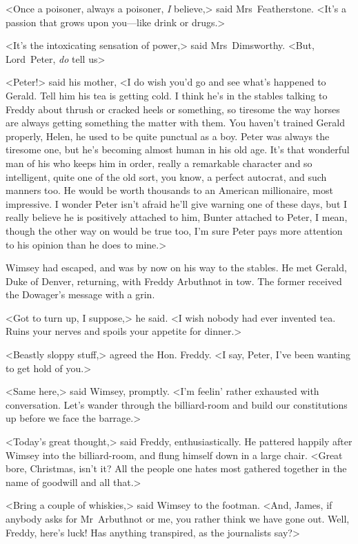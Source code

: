 <Once a poisoner, always a poisoner, \emph{I} believe,> said Mrs~Featherstone. <It's a passion that grows upon you—like drink or drugs.>

<It's the intoxicating sensation of power,> said Mrs~Dimsworthy. <But, Lord~Peter, \emph{do} tell us\longdash>

<Peter!> said his mother, <I do wish you'd go and see what's happened to Gerald. Tell him his tea is getting cold. I think he's in the stables talking to Freddy about thrush or cracked heels or something, so tiresome the way horses are always getting something the matter with them. You haven't trained Gerald properly, Helen, he used to be quite punctual as a boy. Peter was always the tiresome one, but he's becoming almost human in his old age. It's that wonderful man of his who keeps him in order, really a remarkable character and so intelligent, quite one of the old sort, you know, a perfect autocrat, and such manners too. He would be worth thousands to an American millionaire, most impressive. I wonder Peter isn't afraid he'll give warning one of these days, but I really believe he is positively attached to him, Bunter attached to Peter, I mean, though the other way on would be true too, I'm sure Peter pays more attention to his opinion than he does to mine.>

Wimsey had escaped, and was by now on his way to the stables. He met Gerald, Duke of Denver, returning, with Freddy Arbuthnot in tow. The former received the Dowager's message with a grin.

<Got to turn up, I suppose,> he said. <I wish nobody had ever invented tea. Ruins your nerves and spoils your appetite for dinner.>

<Beastly sloppy stuff,> agreed the Hon. Freddy. <I say, Peter, I've been wanting to get hold of you.>

<Same here,> said Wimsey, promptly. <I'm feelin' rather exhausted with conversation. Let's wander through the billiard-room and build our constitutions up before we face the barrage.>

<Today's great thought,> said Freddy, enthusiastically. He pattered happily after Wimsey into the billiard-room, and flung himself down in a large chair. <Great bore, Christmas, isn't it? All the people one hates most gathered together in the name of goodwill and all that.>

<Bring a couple of whiskies,> said Wimsey to the footman. <And, James, if anybody asks for Mr~Arbuthnot or me, you rather think we have gone out. Well, Freddy, here's luck! Has anything transpired, as the journalists say?>

